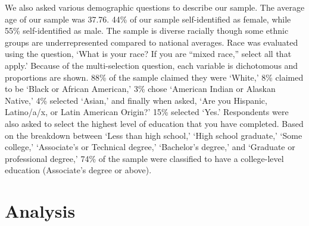 We also asked various demographic questions to describe our sample. The average
age of our sample was 37.76. 44\% of our sample self-identified as female, while
55\% self-identified as male. The sample is diverse racially though some ethnic
groups are underrepresented compared to national averages. Race was evaluated
using the question, `What is your race? If you are ``mixed race,'' select all
that apply.' Because of the multi-selection question, each variable is
dichotomous and proportions are shown. 88\% of the sample claimed they were
`White,' 8\% claimed to be `Black or African American,' 3\% chose `American
Indian or Alaskan Native,' 4\% selected `Asian,' and finally when asked, `Are
you Hispanic, Latino/a/x, or Latin American Origin?' 15\% selected `Yes.'
Respondents were also asked to select the highest level of education that you
have completed. Based on the breakdown between `Less than high school,' `High
school graduate,' `Some college,' `Associate's or Technical degree,' `Bachelor's
degree,' and `Graduate or professional degree,' 74\% of the sample were
classified to have a college-level education (Associate's degree or above).

\hypertarget{analysis}{\section{Analysis}\label{analysis}}

